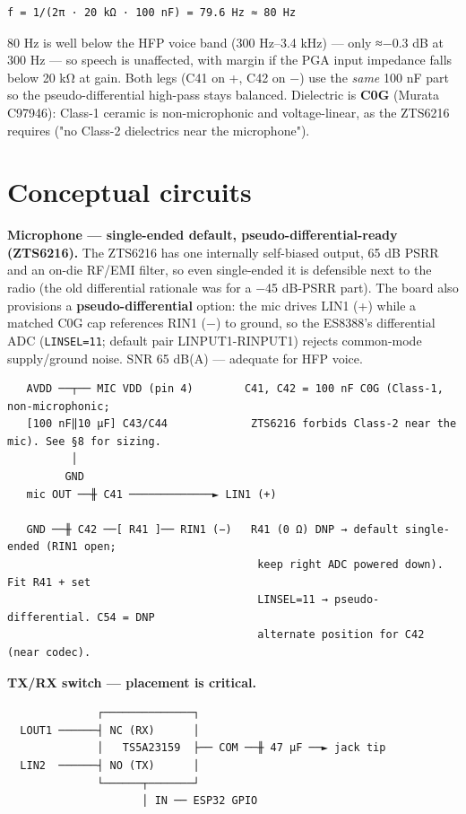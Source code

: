 \documentclass[11pt]{article}
\begin{document}
\begin{Verbatim}
f = 1/(2π · 20 kΩ · 100 nF) = 79.6 Hz ≈ 80 Hz
\end{Verbatim}

80 Hz is well below the HFP voice band (300 Hz–3.4 kHz) — only ≈−0.3 dB at 300 Hz — so speech is
unaffected, with margin if the PGA input impedance falls below 20 kΩ at gain. Both legs (C41 on +,
C42 on −) use the \emph{same} 100 nF part so the pseudo-differential high-pass stays balanced.
Dielectric is \textbf{C0G} (Murata C97946): Class-1 ceramic is non-microphonic and voltage-linear,
as the ZTS6216 requires ("no Class-2 dielectrics near the microphone").

\section{Conceptual circuits}

\textbf{Microphone — single-ended default, pseudo-differential-ready (ZTS6216).} The ZTS6216 has one
internally self-biased output, 65 dB PSRR and an on-die RF/EMI filter, so even single-ended it is
defensible next to the radio (the old differential rationale was for a −45 dB-PSRR part). The board
also provisions a \textbf{pseudo-differential} option: the mic drives LIN1 (+) while a matched C0G
cap references RIN1 (−) to ground, so the ES8388's differential ADC (\texttt{LINSEL=11}; default
pair LINPUT1-RINPUT1) rejects common-mode supply/ground noise. SNR 65 dB(A) — adequate for HFP voice.

\begin{Verbatim}
   AVDD ──┬── MIC VDD (pin 4)        C41, C42 = 100 nF C0G (Class-1, non-microphonic;
   [100 nF‖10 µF] C43/C44             ZTS6216 forbids Class-2 near the mic). See §8 for sizing.
          │
         GND
   mic OUT ──╫ C41 ─────────────► LIN1 (+)

   GND ──╫ C42 ──[ R41 ]── RIN1 (−)   R41 (0 Ω) DNP → default single-ended (RIN1 open;
                                       keep right ADC powered down). Fit R41 + set
                                       LINSEL=11 → pseudo-differential. C54 = DNP
                                       alternate position for C42 (near codec).
\end{Verbatim}

\textbf{TX/RX switch — placement is critical.}

\begin{Verbatim}
              ┌──────────────┐
  LOUT1 ──────┤ NC (RX)      │
              │   TS5A23159  ├── COM ──╫ 47 µF ──► jack tip
  LIN2  ──────┤ NO (TX)      │
              └──────┬───────┘
                     │ IN ── ESP32 GPIO
\end{Verbatim}
\end{document}
